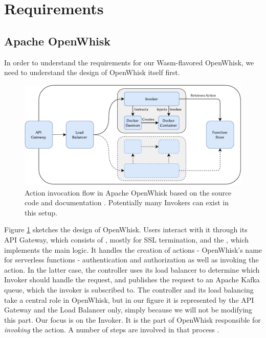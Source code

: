 \section{Requirements}

\subsection{Apache OpenWhisk}

In order to understand the requirements for our Wasm-flavored OpenWhisk, we need to understand the design of OpenWhisk itself first.

\begin{figure}
    \includegraphics{figures/OpenWhiskActionInvocationFlow.pdf}
    \caption{Action invocation flow in Apache OpenWhisk based on the source code and documentation \cite{OpenWhiskSystemDesign}. Potentially many Invokers can exist in this setup.}
    \label{fig:openwhisk-action-invocation-flow}
\end{figure}

Figure \ref{fig:openwhisk-action-invocation-flow} sketches the design of OpenWhisk. Users interact with it through its API Gateway, which consists of , mostly for SSL termination, and the , which implements the main logic. It handles the creation of actions - OpenWhisk's name for serverless functions - authentication and authorization as well as invoking the action.
In the latter case, the controller uses its load balancer to determine which Invoker should handle the request, and publishes the request to an Apache Kafka queue, which the invoker is subscribed to. The controller and its load balancing take a central role in OpenWhisk, but in our figure it is represented by the API Gateway and the Load Balancer only, simply because we will not be modifying this part.
Our focus is on the Invoker. It is the part of OpenWhisk responsible for \emph{invoking} the action. A number of steps are involved in that process \cite{OpenWhiskSystemDesign}.

